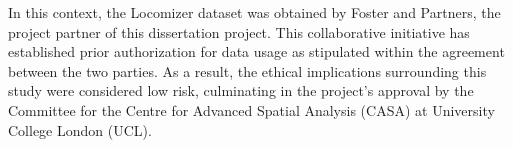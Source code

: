 In this context, the Locomizer dataset was obtained by Foster and Partners, the project partner of this dissertation project. This collaborative initiative has established prior authorization for data usage as stipulated within the agreement between the two parties. As a result, the ethical implications surrounding this study were considered low risk, culminating in the project's approval by the Committee for the Centre for Advanced Spatial Analysis (CASA) at University College London (UCL).